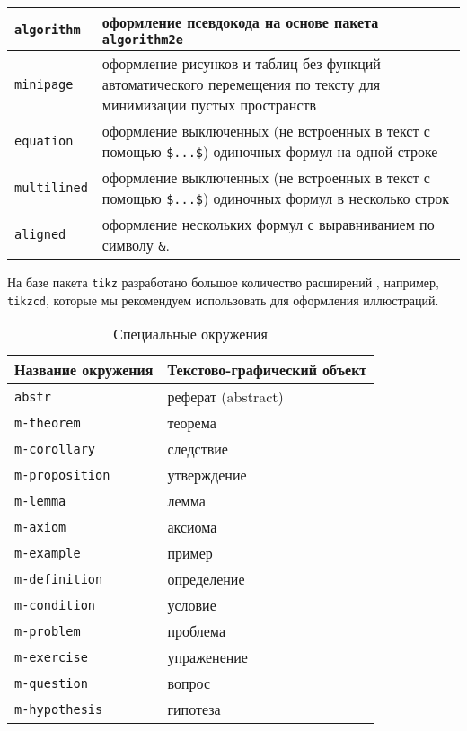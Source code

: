 \begin{table} [htbp]
\begin{Spacing}{\Single}
\begin{tabular}{|l|p{11cm}|}
			\verb|algorithm| &{оформление псевдокода на основе пакета \verb|algorithm2e| \cite{ctan-algorithm2e}} \\ \hline
			\verb|minipage| & {оформление рисунков и таблиц без функций автоматического перемещения по тексту для  минимизации пустых пространств} \\ \hline
			\verb|equation| & {оформление выключенных (не встроенных в текст с помощью \verb|$...$|) одиночных формул на одной строке} \\ \hline
			\verb|multilined| &{оформление выключенных (не встроенных в текст с помощью \verb|$...$|) одиночных формул в несколько строк} \\ \hline 
			\verb|aligned| &{оформление нескольких формул с выравниванием по символу \verb|&|.} \\ \hline
	\end{tabular}
	\end{Spacing}
	\end{table}

На базе пакета \verb|tikz| разработано большое количество расширений \cite{ctan-tikz}, например, \verb|tikzcd|, которые мы рекомендуем использовать для оформления иллюстраций.

	\begin{table} [htbp]%
	\centering\small
	\caption{Специальные окружения}%
	\label{tab:enum-spbpu}
		\begin{tabular}{|l|l|}
			\hline
			Название окружения & Текстово-графический объект\\
			\hline
			\verb|abstr|	 & реферат (abstract) \\ \hline
			\verb|m-theorem| & теорема \\ \hline 
			\verb|m-corollary| & следствие \\ \hline
			\verb|m-proposition| & утверждение \\ \hline
			\verb|m-lemma|   & лемма \\ \hline
			\verb|m-axiom| & аксиома \\ \hline
			\verb|m-example| & пример \\ \hline
			\verb|m-definition| &  определение \\ \hline
			\verb|m-condition| & условие \\ \hline
			\verb|m-problem| & проблема \\ \hline
			\verb|m-exercise| & упраженение \\ \hline
			\verb|m-question| & вопрос \\ \hline
			\verb|m-hypothesis| & гипотеза \\ \hline
		\end{tabular}	
	\normalsize
\end{table}


